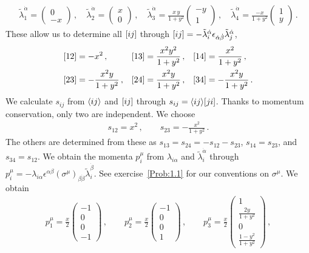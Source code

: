 \begin{align} \label{eq:lambdatildes}
\tilde{\lambda}_1^{\dot{\alpha}} = \begin{pmatrix} 0\\ -x \end{pmatrix} \,, \quad 
\tilde{\lambda}_2^{\dot{\alpha}} = \begin{pmatrix} x \\ 0 \end{pmatrix} \,, \quad
\tilde{\lambda}_3^{\dot{\alpha}} = \frac{x \, y}{1+y^2} \begin{pmatrix} -y \\ 1 \end{pmatrix} \,, \quad
\tilde{\lambda}_4^{\dot{\alpha}} = \frac{-x}{1+y^2} \begin{pmatrix} 1\\  y \end{pmatrix} \,.
\end{align}
These allow us to determine all $[ i j ]$ through $[ i j ] = - \tilde{\lambda}_i^{\dot\alpha} \epsilon_{\dot\alpha \dot\beta} \tilde{\lambda}_j^{\dot\alpha}$,
\begin{align} \label{eq:spBs}
\begin{aligned}
\spB 12 &= -x^2 \,,          &  \spB 13 &=\frac{x^2 y^2}{1+y^2} \,,             &  \spB 14&=\frac{x^2}{1+y^2} \,, \\
\spB 23 &= - \frac{x^2 y}{1+y^2} \,,        &  \spB 24 &=\frac{x^2 y}{1+y^2}\,,  &  \spB 34 & = -\frac{x^2 y}{1+y^2} \,.
\end{aligned}
\end{align}
We calculate $s_{ij}$ from $\langle i j \rangle$ and $[ i j ]$ through $s_{ij} = \langle i j \rangle [ j i ]$. Thanks to momentum conservation, only two are independent. We choose
\begin{align} \label{eq:sijs}
s_{12} = x^2 \,, \qquad s_{23} = - \frac{x^2}{1+y^2} \,.
\end{align}
The others are determined from these as $s_{13}=s_{24}=-s_{12}-s_{23}$, $s_{14}=s_{23}$, and $s_{34}=s_{12}$.
We obtain the momenta $p_i^{\mu}$ from $\lambda_{i\alpha}$ and $\tilde{\lambda}_i^{\dot\alpha}$ through $p_i^{\mu} = - \lambda_{i\alpha} \epsilon^{\alpha\beta} (\sigma^{\mu})_{\beta\dot\beta} \tilde{\lambda}_i^{\dot\beta}$. See exercise~\ref{Prob:1.1} for our conventions on $\sigma^{\mu}$. We obtain
\begin{align} \label{eq:explmom}
p_1^{\mu} = \frac{x}{2} \begin{pmatrix} -1 \\ 0 \\ 0 \\ - 1\end{pmatrix} \,, \qquad p_2^{\mu} = \frac{x}{2} \begin{pmatrix} - 1 \\ 0 \\ 0 \\ 1 \end{pmatrix} \,, \qquad
p_3^{\mu} = \frac{x}{2} \begin{pmatrix} 1 \\ \frac{2 y}{1 + y^2} \\ 0 \\ \frac{1-y^2}{1+y^2} \end{pmatrix}\,,
\end{align}
